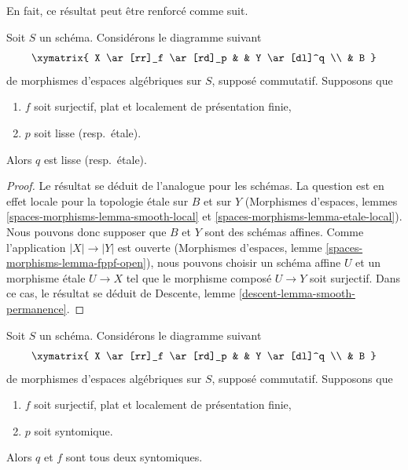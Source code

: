 \noindent
En fait, ce résultat peut être renforcé comme suit.

\begin{lemma}
\label{lemma-smooth-permanence}
Soit $S$ un schéma. Considérons le diagramme suivant
$$
\xymatrix{
X \ar[rr]_f \ar[rd]_p & &
Y \ar[dl]^q \\
& B
}
$$
de morphismes d'espaces algébriques sur $S$, supposé commutatif. Supposons que
\begin{enumerate}
\item $f$ soit surjectif, plat et localement de présentation finie,
\item $p$ soit lisse (resp.\ \'etale).
\end{enumerate}
Alors $q$ est lisse (resp.\ \'etale).
\end{lemma}

\begin{proof}
Le résultat se déduit de l'analogue pour les schémas.
La question est en effet locale pour la topologie \'etale sur $B$ et sur $Y$
(Morphismes d'espaces, lemmes
\ref{spaces-morphisms-lemma-smooth-local} et
\ref{spaces-morphisms-lemma-etale-local}).
Nous pouvons donc supposer que $B$ et $Y$ sont des
schémas affines. Comme l'application $|X| \to |Y|$ est ouverte
(Morphismes d'espaces, lemme \ref{spaces-morphisms-lemma-fppf-open}),
nous pouvons choisir un
schéma affine $U$ et un morphisme \'etale $U \to X$ tel que le
morphisme composé $U \to Y$ soit surjectif. Dans ce cas, le résultat
se déduit de Descente, lemme
\ref{descent-lemma-smooth-permanence}.
\end{proof}

\begin{lemma}
\label{lemma-syntomic-permanence}
Soit $S$ un schéma. Considérons le diagramme suivant
$$
\xymatrix{
X \ar[rr]_f \ar[rd]_p & &
Y \ar[dl]^q \\
& B
}
$$
de morphismes d'espaces algébriques sur $S$, supposé commutatif. Supposons que
\begin{enumerate}
\item $f$ soit surjectif, plat et localement de présentation finie,
\item $p$ soit syntomique.
\end{enumerate}
Alors $q$ et $f$ sont tous deux syntomiques.
\end{lemma}

